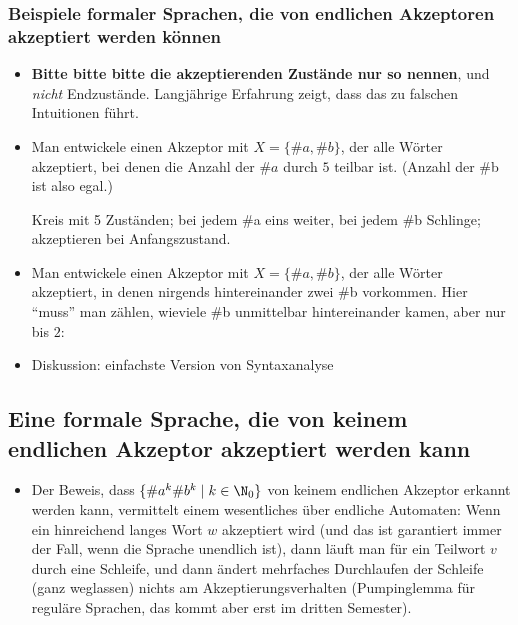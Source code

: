 \documentclass[12pt]{article}
\theoremstyle{margin}
\theoremstyle{margin}
\begin{document}
\subsubsection{Beispiele formaler Sprachen, die von endlichen Akzeptoren akzeptiert werden k\"onnen}
  \begin{itemize}
  \item \textbf{Bitte bitte bitte die akzeptierenden Zustände nur so
      nennen}, und \emph{nicht} Endzustände. Langjährige Erfahrung
    zeigt, dass das zu falschen Intuitionen führt.
  \item Man entwickele einen Akzeptor mit $X=\{\#a,\#b\}$, der alle
    Wörter akzeptiert, bei denen die Anzahl der $\#a$ durch $5$
    teilbar ist. (Anzahl der \#b ist also egal.)

    Kreis mit 5 Zuständen; bei jedem \#a eins weiter, bei jedem \#b
    Schlinge; akzeptieren bei Anfangszustand.
  \item Man entwickele einen Akzeptor mit $X=\{\#a,\#b\}$, der alle
    Wörter akzeptiert, in denen nirgends hintereinander zwei \#b
    vorkommen. Hier "`muss"' man zählen, wieviele \#b unmittelbar
    hintereinander kamen, aber nur bis $2$:

  \item Diskussion: einfachste Version von Syntaxanalyse
  \end{itemize}
\subsection{Eine formale Sprache, die von keinem endlichen Akzeptor akzeptiert werden kann}
  \begin{itemize}
  \item Der Beweis, dass $\{\#a^k\#b^k \mid
    k\in\N_0\}$ von keinem endlichen Akzeptor erkannt werden kann, vermittelt einem
    wesentliches über endliche Automaten: Wenn ein
    hinreichend langes Wort $w$ akzeptiert wird (und das ist
    garantiert immer der Fall, wenn die Sprache unendlich ist), dann
    läuft man für ein Teilwort $v$ durch eine Schleife, und dann
    ändert mehrfaches Durchlaufen der Schleife (\bzw ganz weglassen)
    nichts am Akzeptierungsverhalten (Pumpinglemma für reguläre
    Sprachen, das kommt aber erst im dritten Semester).
  \end{itemize}
\end{document}
